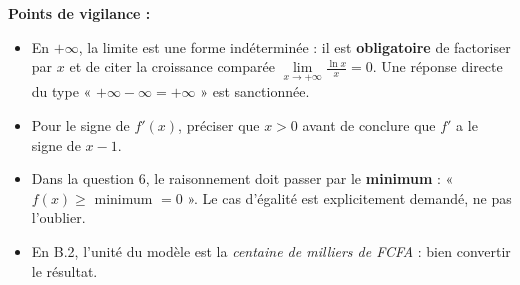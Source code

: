 \documentclass[11pt]{article}
\begin{document}
\begin{corrige}
\textbf{Points de vigilance :}
\begin{itemize}
\item En $+\infty$, la limite est une forme indéterminée : il est \textbf{obligatoire} de factoriser par $x$ et de citer la croissance comparée $\lim\limits_{x\to+\infty}\frac{\ln x}{x}=0$. Une réponse directe du type « $+\infty-\infty=+\infty$ » est sanctionnée.
\item Pour le signe de $f'(x)$, préciser que $x>0$ avant de conclure que $f'$ a le signe de $x-1$.
\item Dans la question 6, le raisonnement doit passer par le \textbf{minimum} : « $f(x)\geq$ minimum $=0$ ». Le cas d'égalité est explicitement demandé, ne pas l'oublier.
\item En B.2, l'unité du modèle est la \emph{centaine de milliers de FCFA} : bien convertir le résultat.
\end{itemize}
\end{corrige}
\end{document}
